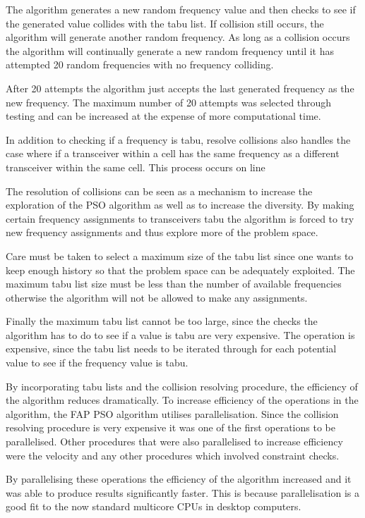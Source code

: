 The algorithm generates a new random frequency value and then checks to see if the generated value collides with the tabu list. If collision still occurs, the algorithm will generate another random frequency. As long as a collision occurs the algorithm will continually generate a new random frequency until it has attempted 20 random frequencies with no frequency colliding. 

After 20 attempts the algorithm just accepts the last generated frequency as the new frequency. The maximum number of 20  attempts was selected through testing and can be increased at the expense of more computational time. 

In addition to checking if a frequency is tabu, resolve collisions also handles the case where if a transceiver within a cell has the same frequency as a different transceiver within the same cell. This process occurs on line 

The resolution of collisions can be seen as a mechanism to increase the exploration of the \gls{PSO} algorithm as well as to increase the diversity. By making certain frequency assignments to transceivers tabu the algorithm is forced to try new frequency assignments and thus explore more of the problem space.

Care must be taken to select a maximum size of the tabu list since one wants to keep enough history so that the problem space can be adequately exploited. The maximum tabu list size must be less than the number of available frequencies otherwise the algorithm will not be allowed to make any assignments. 

Finally the maximum tabu list cannot be too large, since the checks the algorithm has to do to see if a value is tabu are very expensive. The operation is expensive, since the tabu list needs to be iterated through for each potential value to see if the frequency value is tabu.

By incorporating tabu lists and the collision resolving procedure, the efficiency of the algorithm reduces dramatically. To increase efficiency of the operations in the algorithm, the \gls{FAP} \gls{PSO} algorithm utilises parallelisation. Since the collision resolving procedure is very expensive it was one of the first operations to be parallelised. Other procedures that were also parallelised to increase efficiency were the velocity and any other procedures which involved constraint checks.

By parallelising these operations the efficiency of the algorithm increased and it was able to produce results significantly faster. This is because parallelisation is a good fit to the now standard multicore CPUs in desktop computers.

